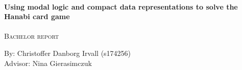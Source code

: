\begin{titlepage}
	
	
	\HRule\\[0.5cm]
	
	{\huge\bfseries Using modal logic and compact data representations to solve the Hanabi card game}\\[0.4cm] %

	\HRule\\[0.5cm]
	
	 \textsc{\Large Bachelor report}\\[1cm] %
	
    \begin{minipage}{0.7\textwidth}
		\begin{flushleft}
            \centering
            \large
            By: Christoffer Danborg Irvall (s174256) \\ [0.2cm]
            

	    Advisor: Nina Gierasimczuk \\
                        
		\end{flushleft}
	\end{minipage} 
    \\[1cm]
    \vfill \vfill



	
	\vfill\vfill\vfill %
	
	
	\vfill %
	
\end{titlepage}
